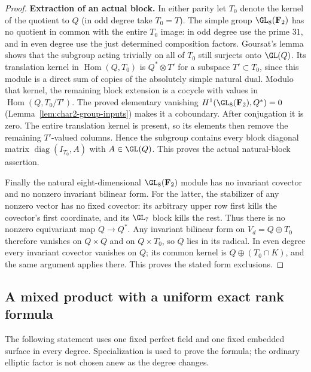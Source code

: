 \begin{proof}
\par\smallskip\noindent\textbf{Extraction of an actual block.}
In either parity let $T_0$ denote the kernel of the quotient to $Q$
(in odd degree take $T_0=T$). The simple group $\GL_8(\mathbf F_2)$
has no quotient in common with the entire $T_0$ image: in odd degree
use the prime $31$, and in even degree use the just determined
composition factors. Goursat's lemma shows that the subgroup acting
trivially on all of $T_0$ still surjects onto $\GL(Q)$.
Its translation kernel in $\operatorname{Hom}(Q,T_0)$ is
$Q^*\otimes T'$ for a subspace $T'\subset T_0$, since this module
is a direct sum of copies of the absolutely simple natural dual.
Modulo that kernel, the remaining block extension is a cocycle with
values in $\operatorname{Hom}(Q,T_0/T')$.
The proved elementary vanishing
$H^1(\GL_8(\mathbf F_2),Q^*)=0$
(Lemma~\ref{lem:char2-group-inputs}) makes it a coboundary.
After conjugation it is zero. The entire translation kernel is
present, so its elements then remove the remaining $T'$-valued
columns. Hence the subgroup contains every block diagonal matrix
$\operatorname{diag}(I_{T_0},A)$ with $A\in\GL(Q)$.
This proves the actual natural-block assertion.

Finally the natural eight-dimensional $\GL_8(\mathbf F_2)$ module
has no invariant covector and no nonzero invariant bilinear form.
For the latter, the stabilizer of any nonzero vector has no fixed
covector: its arbitrary upper row first kills the covector's first
coordinate, and its $\GL_7$ block kills the rest. Thus there is
no nonzero equivariant map $Q\to Q^*$.
Any invariant bilinear form on $V_d=Q\oplus T_0$ therefore vanishes
on $Q\times Q$ and on $Q\times T_0$, so $Q$ lies in its radical.
In even degree every invariant covector vanishes on $Q$; its common
kernel is $Q\oplus(T_0\cap K)$, and the same argument applies there.
This proves the stated form exclusions.
\end{proof}


\subsection{A mixed product with a uniform exact rank formula}
\label{sec:DE-A3-mixed-generic}

The following statement uses one fixed perfect field and one fixed embedded
surface in every degree.  Specialization is used to prove the formula;
the ordinary elliptic factor is not chosen anew as the degree changes.

